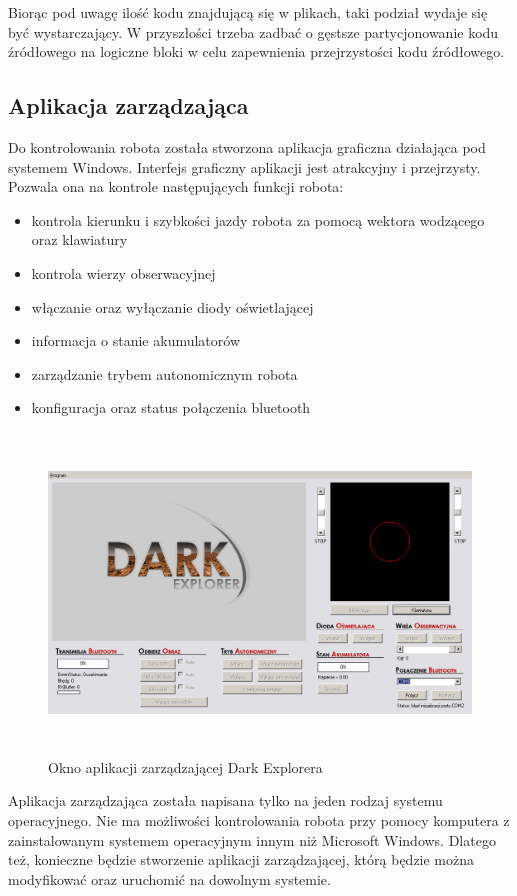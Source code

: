 Biorąc pod uwagę ilość kodu znajdującą się w plikach, taki podział wydaje się być wystarczający. W przyszłości trzeba zadbać o gęstsze partycjonowanie kodu źródłowego na logiczne bloki w celu zapewnienia przejrzystości kodu źródłowego.

\subsection{Aplikacja zarządzająca}
Do kontrolowania robota została stworzona aplikacja graficzna działająca pod systemem Windows. Interfejs graficzny aplikacji jest atrakcyjny i przejrzysty. Pozwala ona na kontrole następujących funkcji robota:
\begin{itemize}
 \item kontrola kierunku i szybkości jazdy robota za pomocą wektora wodzącego oraz klawiatury
 \item kontrola wierzy obserwacyjnej
 \item włączanie oraz wyłączanie diody oświetlającej
 \item informacja o stanie akumulatorów
 \item zarządzanie trybem autonomicznym robota
 \item konfiguracja oraz status połączenia bluetooth\\
\end{itemize}

\begin{figure}[!ht]
 \centering
 \includegraphics[height=85mm]{../images/ch02/decontrollprogram.png}
 \caption{Okno aplikacji zarządzającej Dark Explorera}
 \label{fig:AplikacjaZarz}
\end{figure}

Aplikacja zarządzająca została napisana tylko na jeden rodzaj systemu operacyjnego. Nie ma możliwości kontrolowania robota przy pomocy komputera z zainstalowanym systemem operacyjnym innym niż Microsoft Windows. Dlatego też, konieczne będzie stworzenie aplikacji zarządzającej, którą będzie można modyfikować oraz uruchomić na dowolnym systemie.

